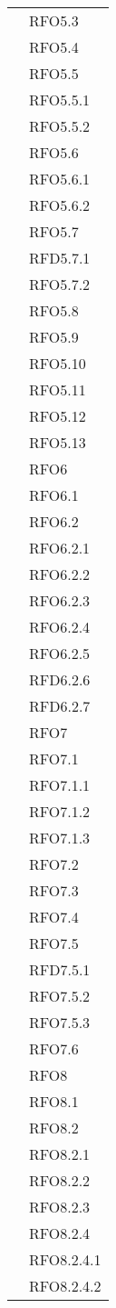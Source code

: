 \begin{longtable}{ p{12cm} | p{4cm} }
	& RFO5.3 \\
	& RFO5.4 \\
	& RFO5.5 \\
	& RFO5.5.1 \\
	& RFO5.5.2 \\
	& RFO5.6 \\
	& RFO5.6.1 \\
	& RFO5.6.2 \\
	& RFO5.7 \\
	& RFD5.7.1 \\
	& RFO5.7.2 \\
	& RFO5.8 \\
	& RFO5.9 \\
	& RFO5.10 \\
	& RFO5.11 \\
	& RFO5.12 \\
	& RFO5.13 \\
	& RFO6 \\
	& RFO6.1 \\
	& RFO6.2 \\
	& RFO6.2.1 \\
	& RFO6.2.2 \\
	& RFO6.2.3 \\
	& RFO6.2.4 \\
	& RFO6.2.5 \\
	& RFD6.2.6 \\
	& RFD6.2.7 \\
	& RFO7 \\
	& RFO7.1 \\
	& RFO7.1.1 \\
	& RFO7.1.2 \\
	& RFO7.1.3 \\
	& RFO7.2 \\
	& RFO7.3 \\
	& RFO7.4 \\
	& RFO7.5 \\
	& RFD7.5.1 \\
	& RFO7.5.2 \\
	& RFO7.5.3 \\
	& RFO7.6 \\
	& RFO8 \\
	& RFO8.1 \\
	& RFO8.2 \\
	& RFO8.2.1 \\
	& RFO8.2.2 \\
	& RFO8.2.3 \\
	& RFO8.2.4 \\
	& RFO8.2.4.1 \\
	& RFO8.2.4.2 \\

\end{longtable}
